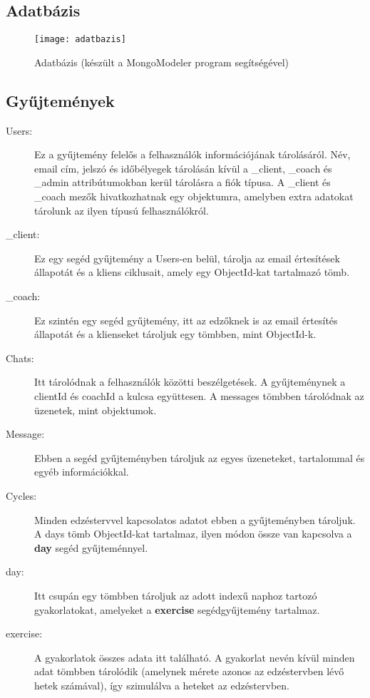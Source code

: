 \begin{landscape}
\section{Adatbázis}
\label{ch:adatbazis}
	\begin{figure}[H]
		\centering
		\texttt{[image: adatbazis]}
		\caption{Adatbázis (készült a MongoModeler \cite{mongomodeler} program segítségével)}
		\label{fig:adatbazis}
	\end{figure}
\end{landscape}

\subsection{Gyűjtemények}

\begin{description}
	\item[Users:] Ez a gyűjtemény felelős a felhasználók információjának tárolásáról. Név, email cím, jelszó és időbélyegek tárolásán kívül a \_client, \_coach és \_admin attribútumokban kerül tárolásra a fiók típusa. A \_client és \_coach mezők hivatkozhatnak egy objektumra, amelyben extra adatokat tárolunk az ilyen típusú felhasználókról.
	\item[\_client:] Ez egy segéd gyűjtemény a Users-en belül, tárolja az email értesítések állapotát és a kliens ciklusait, amely egy ObjectId-kat tartalmazó tömb.
	\item[\_coach:] Ez szintén egy segéd gyűjtemény, itt az edzőknek is az email értesítés állapotát és a klienseket tároljuk egy tömbben, mint ObjectId-k.
	\item[Chats:] Itt tárolódnak a felhasználók közötti beszélgetések. A gyűjteménynek a clientId és coachId a kulcsa együttesen. A messages tömbben tárolódnak az üzenetek, mint objektumok.
	\item[Message:] Ebben a segéd gyűjteményben tároljuk az egyes üzeneteket, tartalommal és egyéb információkkal. 
	\item[Cycles:] Minden edzéstervvel kapcsolatos adatot ebben a gyűjteményben tároljuk. A days tömb ObjectId-kat tartalmaz, ilyen módon össze van kapcsolva a \textbf{day} segéd gyűjteménnyel.
	\item[day:] Itt csupán egy tömbben tároljuk az adott indexű naphoz tartozó gyakorlatokat, amelyeket a \textbf{exercise} segédgyűjtemény tartalmaz.
	\item[exercise:] A gyakorlatok összes adata itt található. A gyakorlat nevén kívül minden adat tömbben tárolódik (amelynek mérete azonos az edzéstervben lévő hetek számával), így szimulálva a heteket az edzéstervben.
\end{description}

